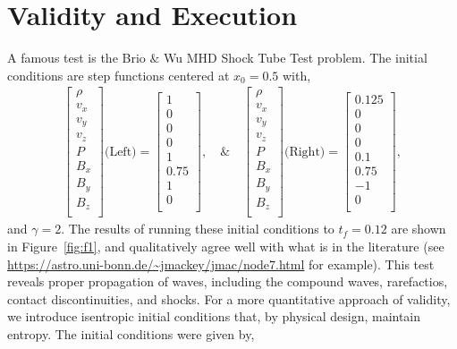 \documentclass[iop,twocolumn]{emulateapj}
\begin{document}
\section{Validity and Execution}
A famous test is the Brio $\&$ Wu MHD Shock Tube Test problem. The initial conditions are step functions centered at $x_0=0.5$ with,
\begin{align}\label{eq:ic}
  \begin{bmatrix}
    \rho \\
    v_x\\
    v_y\\
    v_z\\
    P\\
    B_x\\
    B_y\\
    B_z\\
  \end{bmatrix}
  \textrm{(Left)}=
  \begin{bmatrix}
    1\\
    0\\
    0\\
    0\\
    1\\
    0.75\\
    1\\
    0\\
  \end{bmatrix}
  ,\quad\&\quad
  \begin{bmatrix}
    \rho \\
    v_x\\
    v_y\\
    v_z\\
    P\\
    B_x\\
    B_y\\
    B_z\\
  \end{bmatrix}
  \textrm{(Right)}=
  \begin{bmatrix}
    0.125\\
    0\\
    0\\
    0\\
    0.1\\
    0.75\\
    -1\\
    0\\
  \end{bmatrix},
\end{align}
and $\gamma=2$. The results of running these initial conditions to $t_f=0.12$ are shown in Figure~\ref{fig:f1}, and qualitatively agree well with what is in the literature (see \url{https://astro.uni-bonn.de/~jmackey/jmac/node7.html} for example). This test reveals proper propagation of waves, including the compound waves, rarefactios, contact discontinuities, and shocks. For a more quantitative approach of validity, we introduce isentropic initial conditions that, by physical design, maintain entropy. The initial conditions were given by,
\end{document}
